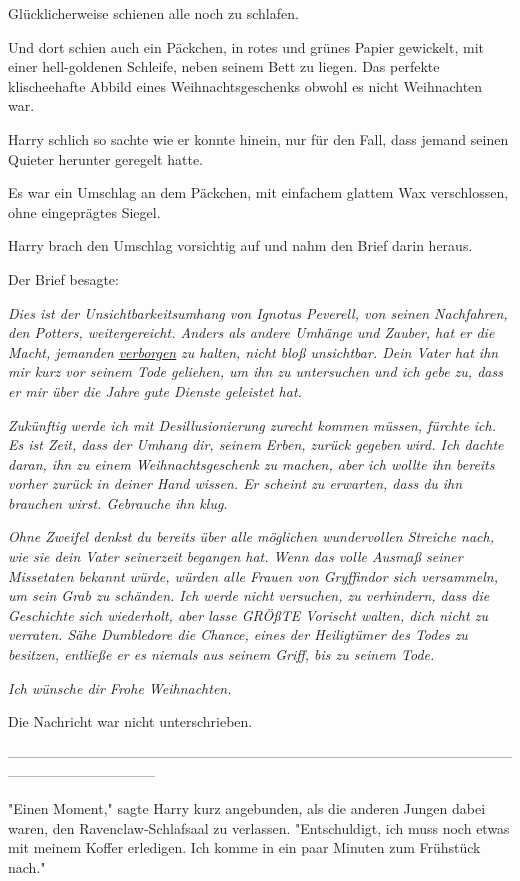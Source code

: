 {Glücklicherweise schienen alle noch zu schlafen.

Und dort schien auch ein Päckchen, in rotes und grünes Papier gewickelt, mit einer hell-goldenen Schleife, neben seinem Bett zu liegen. Das perfekte klischeehafte Abbild eines Weihnachtsgeschenks obwohl es nicht Weihnachten war.

Harry schlich so sachte wie er konnte hinein, nur für den Fall, dass jemand seinen Quieter herunter geregelt hatte.

Es war ein Umschlag an dem Päckchen, mit einfachem glattem Wax verschlossen, ohne eingeprägtes Siegel.

Harry brach den Umschlag vorsichtig auf und nahm den Brief darin heraus.

Der Brief besagte:

\emph{Dies ist der Unsichtbarkeitsumhang von Ignotus Peverell, von seinen Nachfahren, den Potters, weitergereicht. Anders als andere Umhänge und Zauber, hat er die Macht, jemanden} \emph{\uline{verborgen}} \emph{zu halten, nicht bloß unsichtbar. Dein Vater hat ihn mir kurz vor seinem Tode geliehen, um ihn zu untersuchen und ich gebe zu, dass er mir über die Jahre gute Dienste geleistet hat.}

\emph{Zukünftig werde ich mit Desillusionierung zurecht kommen müssen, fürchte ich. Es ist Zeit, dass der Umhang dir, seinem Erben, zurück gegeben wird. Ich dachte daran, ihn zu einem Weihnachtsgeschenk zu machen, aber ich wollte ihn bereits vorher zurück in deiner Hand wissen. Er scheint zu erwarten, dass du ihn brauchen wirst. Gebrauche ihn klug.}

\emph{Ohne Zweifel denkst du bereits über alle möglichen wundervollen Streiche nach, wie sie dein Vater seinerzeit begangen hat. Wenn das volle Ausmaß seiner Missetaten bekannt würde, würden alle Frauen von Gryffindor sich versammeln, um sein Grab zu schänden. Ich werde nicht versuchen, zu verhindern, dass die Geschichte sich wiederholt, aber lasse GRÖßTE Vorischt walten, dich nicht zu verraten. Sähe Dumbledore die Chance, eines der Heiligtümer des Todes zu besitzen, entließe er es niemals aus seinem Griff, bis zu seinem Tode.}

\emph{Ich wünsche dir Frohe Weihnachten.}

Die Nachricht war nicht unterschrieben.

--------------------------------------------------------------------------------------------------------------------------------------------

"Einen Moment," sagte Harry kurz angebunden, als die anderen Jungen dabei waren, den Ravenclaw-Schlafsaal zu verlassen. "Entschuldigt, ich muss noch etwas mit meinem Koffer erledigen. Ich komme in ein paar Minuten zum Frühstück nach."

}
